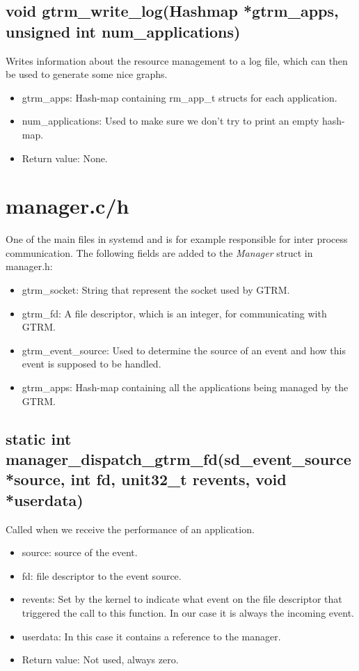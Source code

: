 \documentclass[nobiblatex]{LTHthesis}
\begin{document}
\subsection{void gtrm\_write\_log(Hashmap *gtrm\_apps, unsigned int num\_applications)}
Writes information about the resource management to a log file, which can then be used to generate some nice graphs.
\begin{itemize} 
\item gtrm\_apps: Hash-map containing rm\_app\_t structs for each application.
\item num\_applications: Used to make sure we don't try to print an empty hash-map.
\item Return value: None.
\end{itemize}

\section{manager.c/h}
One of the main files in systemd and is for example responsible for inter process communication. The following fields are added to the \emph{Manager} struct in manager.h:
\begin{itemize}
\item gtrm\_socket: String that represent the socket used by GTRM.
\item gtrm\_fd: A file descriptor, which is an integer, for communicating with GTRM.
\item gtrm\_event\_source: Used to determine the source of an event and how this event is supposed to be handled.
\item gtrm\_apps: Hash-map containing all the applications being managed by the GTRM.
\end{itemize}

\subsection{static int manager\_dispatch\_gtrm\_fd(sd\_event\_source *source, int fd, unit32\_t revents, void *userdata)}
Called when we receive the performance of an application.
\begin{itemize}
\item source: source of the event.
\item fd: file descriptor to the event source.
\item revents: Set by the kernel to indicate what event on the file descriptor that triggered the call to this function. In our case it is always the incoming event.
\item userdata: In this case it contains a reference to the manager.
\item Return value: Not used, always zero.
\end{itemize}
\end{document}
